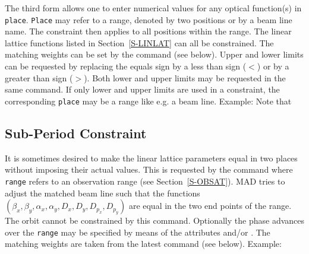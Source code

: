The third form
allows one to enter numerical values for any optical function(s)
in {\tt place}.
{\tt Place} may refer to a range,
denoted by two positions or by a beam line name.
The constraint then applies to all positions within the range.
The linear lattice functions listed in Section~\ref{S-LINLAT}
can all be constrained.
The matching weights can be set by the  command (see below).
Upper and lower limits can be requested by replacing the equals sign
by a less than sign (\(<\)) or by a greater than sign (\(>\)).
Both lower and upper limits may be requested in the same command.
If only lower and upper limits are used in a constraint,
the corresponding {\tt place} may be a range like e.g. a beam line.
Example:
Note that 

\subsection{Sub-Period Constraint}
It is sometimes desired to make the linear lattice parameters
equal in two places without imposing their actual values.
This is requested by the  command
where {\tt range} refers to an observation range
(see Section~\ref{S-OBSAT}).
MAD tries to adjust the matched beam line such that the functions
\((\beta_{x}, \beta_{y}, \alpha_{x}, \alpha_{y},
D_{x}, D_{y}, D_{p_{x}}, D_{p_{y}})\)
are equal in the two end points of the range.
The orbit cannot be constrained by this command.
Optionally the phase advances over the {\tt range}
may be specified by means of the attributes  and/or .
The matching weights are taken from the latest  command
(see below).
Example:
